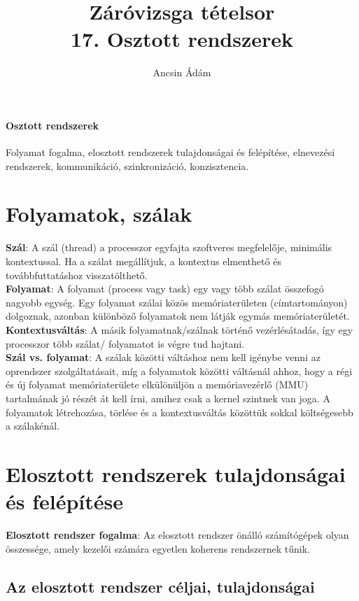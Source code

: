 \documentclass[margin=0px]{article}
\title{Záróvizsga tételsor \\ \large 17. Osztott rendszerek}
\date{}
\author{Ancsin Ádám}
\newenvironment{tetel}[1]{\paragraph{#1 \\}}{}
\begin{document}
	\maketitle
	
	\begin{tetel}{Osztott rendszerek}
		Folyamat fogalma, elosztott rendszerek tulajdonságai és felépítése, elnevezési rendszerek, kommunikáció, szinkronizáció, konzisztencia.
	\end{tetel}
	
	\section{Folyamatok, szálak}
	
	\noindent \textbf{Szál}: A szál (thread) a processzor egyfajta szoftveres megfelelője, minimális kontextussal. Ha a szálat
	megállítjuk, a kontextus elmenthető és továbbfuttatáshoz visszatölthető.\\
	
	\noindent \textbf{Folyamat}: A folyamat (process vagy task) egy vagy több szálat összefogó nagyobb egység. Egy folyamat
	szálai közös memóriaterületen (címtartományon) dolgoznak, azonban különböző folyamatok nem látják egymás memóriaterületét.\\
	
	\noindent \textbf{Kontextusváltás}: A másik folyamatnak/szálnak történő vezérlésátadás, így egy processzor több szálat/ folyamatot
	is végre tud hajtani.\\
	
	\noindent \textbf{Szál vs. folyamat}: A szálak közötti váltáshoz nem kell igénybe venni az oprendszer szolgáltatásait, míg
	a folyamatok közötti váltásnál ahhoz, hogy a régi és új folyamat memóriaterülete elkülönüljön a memóriavezérlő (MMU)
	tartalmának jó részét át kell írni, amihez csak a kernel szintnek van joga. A folyamatok létrehozása, törlése és a kontextusváltás
	közöttük sokkal költségesebb a szálakénál. 
	
	\section{Elosztott rendszerek tulajdonságai és felépítése}
	
	\noindent \textbf{Elosztott rendszer fogalma}: Az elosztott rendszer önálló számítógépek olyan összessége, amely kezelői számára
	egyetlen koherens rendszernek tűnik.

	\subsection{Az elosztott rendszer céljai, tulajdonságai}
	
\end{document}
